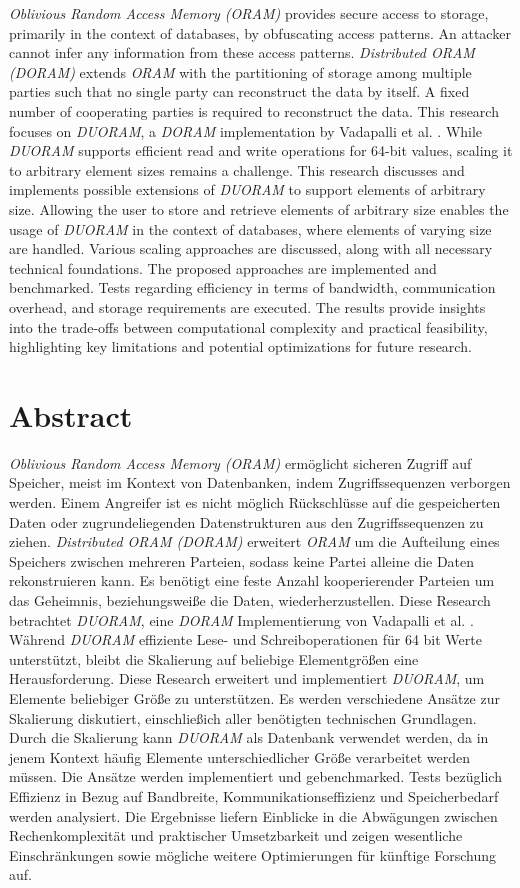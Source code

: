 \Abstract
\textit{Oblivious Random Access Memory (ORAM)} provides secure access to storage, primarily in the context of databases, by obfuscating access patterns.
An attacker cannot infer any information from these access patterns.
\textit{Distributed ORAM (DORAM)} extends \textit{ORAM} with the partitioning of storage among multiple parties such that no single party can reconstruct the data by itself.
A fixed number of cooperating parties is required to reconstruct the data.
This research focuses on \textit{DUORAM}, a \textit{DORAM} implementation by Vadapalli et al. \cite{vadapalli2023duoram}.
While \textit{DUORAM} supports efficient read and write operations for 64-bit values, scaling it to arbitrary element sizes remains a challenge.
This research discusses and implements possible extensions of \textit{DUORAM} to support elements of arbitrary size.
Allowing the user to store and retrieve elements of arbitrary size enables the usage of \textit{DUORAM} in the context of databases, where elements of varying size are handled.
Various scaling approaches are discussed, along with all necessary technical foundations.
The proposed approaches are implemented and benchmarked.
Tests regarding efficiency in terms of bandwidth, communication overhead, and storage requirements are executed.
The results provide insights into the trade-offs between computational complexity and practical feasibility, highlighting key limitations and potential optimizations for future research.

\section*{Abstract}
\textit{Oblivious Random Access Memory (ORAM)} ermöglicht sicheren Zugriff auf Speicher, meist im Kontext von Datenbanken, indem Zugriffssequenzen verborgen werden.
Einem Angreifer ist es nicht möglich Rückschlüsse auf die gespeicherten Daten oder zugrundeliegenden Datenstrukturen aus den Zugriffssequenzen zu ziehen.
\textit{Distributed ORAM (DORAM)} erweitert \textit{ORAM} um die Aufteilung eines Speichers zwischen mehreren Parteien, sodass keine Partei alleine die Daten rekonstruieren kann.
Es benötigt eine feste Anzahl kooperierender Parteien um das Geheimnis, beziehungsweiße die Daten, wiederherzustellen.
Diese Research betrachtet \textit{DUORAM}, eine \textit{DORAM} Implementierung von Vadapalli et al. \cite{vadapalli2023duoram}.
Während \textit{DUORAM} effiziente Lese- und Schreiboperationen für 64 bit Werte unterstützt, bleibt die Skalierung auf beliebige Elementgrößen eine Herausforderung.
Diese Research erweitert und implementiert \textit{DUORAM}, um Elemente beliebiger Größe zu unterstützen.
Es werden verschiedene Ansätze zur Skalierung diskutiert, einschließich aller benötigten technischen Grundlagen.
Durch die Skalierung kann \textit{DUORAM} als Datenbank verwendet werden, da in jenem Kontext häufig Elemente unterschiedlicher Größe verarbeitet werden müssen.
Die Ansätze werden implementiert und gebenchmarked.
Tests bezüglich Effizienz in Bezug auf Bandbreite, Kommunikationseffizienz und Speicherbedarf werden analysiert.
Die Ergebnisse liefern Einblicke in die Abwägungen zwischen Rechenkomplexität und praktischer Umsetzbarkeit und zeigen wesentliche Einschränkungen sowie mögliche weitere Optimierungen für künftige Forschung auf.